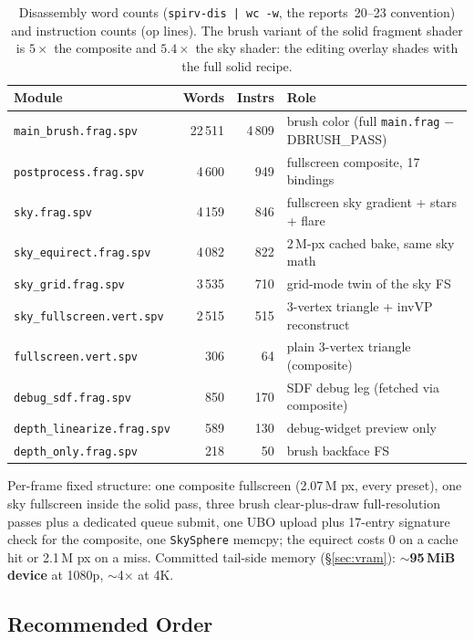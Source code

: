 \documentclass[11pt,a4paper]{article}
\begin{document}
\begin{table}[h]
\centering
\small
\begin{tabular}{@{}lrrl@{}}
\toprule
\textbf{Module} & \textbf{Words} & \textbf{Instrs} & \textbf{Role} \\
\midrule
\texttt{main\_brush.frag.spv} & 22\,511 & 4\,809 & brush color (full \texttt{main.frag} $-$DBRUSH\_PASS) \\
\texttt{postprocess.frag.spv} & 4\,600 & 949 & fullscreen composite, 17 bindings \\
\texttt{sky.frag.spv} & 4\,159 & 846 & fullscreen sky gradient + stars + flare \\
\texttt{sky\_equirect.frag.spv} & 4\,082 & 822 & 2\,M-px cached bake, same sky math \\
\texttt{sky\_grid.frag.spv} & 3\,535 & 710 & grid-mode twin of the sky FS \\
\texttt{sky\_fullscreen.vert.spv} & 2\,515 & 515 & 3-vertex triangle + invVP reconstruct \\
\texttt{fullscreen.vert.spv} & 306 & 64 & plain 3-vertex triangle (composite) \\
\texttt{debug\_sdf.frag.spv} & 850 & 170 & SDF debug leg (fetched via composite) \\
\texttt{depth\_linearize.frag.spv} & 589 & 130 & debug-widget preview only \\
\texttt{depth\_only.frag.spv} & 218 & 50 & brush backface FS \\
\bottomrule
\end{tabular}
\caption{Disassembly word counts (\texttt{spirv-dis | wc -w}, the
reports~20--23 convention) and instruction counts (op lines). The brush
variant of the solid fragment shader is $5\times$ the composite and
$5.4\times$ the sky shader: the editing overlay shades with the full solid
recipe.}
\end{table}

Per-frame fixed structure: one composite fullscreen (2.07\,M px, every
preset), one sky fullscreen inside the solid pass, three brush
clear-plus-draw full-resolution passes plus a dedicated queue submit, one
UBO upload plus 17-entry signature check for the composite, one
\texttt{SkySphere} memcpy; the equirect costs 0 on a cache hit or 2.1\,M px
on a miss. Committed tail-side memory (\S\ref{sec:vram}):
\textbf{$\sim$95\,MiB device} at 1080p, $\sim$4$\times$ at 4K.

\subsection{Recommended Order}
\end{document}
